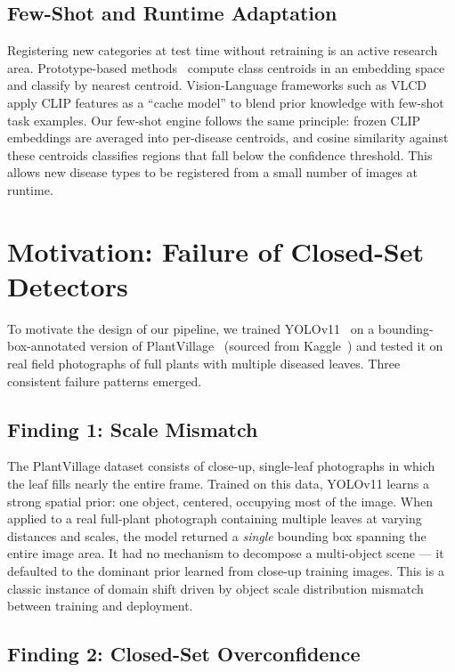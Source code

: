 \documentclass[runningheads]{llncs}
\begin{document}
\subsection{Few-Shot and Runtime Adaptation}
Registering new categories at test time without retraining is an active research area. Prototype-based methods~\cite{snell2017prototypical} compute class centroids in an embedding space and classify by nearest centroid. Vision-Language frameworks such as VLCD apply CLIP features as a ``cache model'' to blend prior knowledge with few-shot task examples. Our few-shot engine follows the same principle: frozen CLIP embeddings are averaged into per-disease centroids, and cosine similarity against these centroids classifies regions that fall below the confidence threshold. This allows new disease types to be registered from a small number of images at runtime.

\section{Motivation: Failure of Closed-Set Detectors}
\label{sec:motivation}

To motivate the design of our pipeline, we trained YOLOv11~\cite{jocher2024ultralytics} on a bounding-box-annotated version of PlantVillage~\cite{hughes2015open} (sourced from Kaggle~\cite{plantvillage_yolo_kaggle}) and tested it on real field photographs of full plants with multiple diseased leaves. Three consistent failure patterns emerged.

\subsection{Finding 1: Scale Mismatch}

The PlantVillage dataset consists of close-up, single-leaf photographs in which the leaf fills nearly the entire frame. Trained on this data, YOLOv11 learns a strong spatial prior: one object, centered, occupying most of the image. When applied to a real full-plant photograph containing multiple leaves at varying distances and scales, the model returned a \emph{single} bounding box spanning the entire image area. It had no mechanism to decompose a multi-object scene --- it defaulted to the dominant prior learned from close-up training images. This is a classic instance of domain shift driven by object scale distribution mismatch between training and deployment.

\subsection{Finding 2: Closed-Set Overconfidence}
\end{document}
